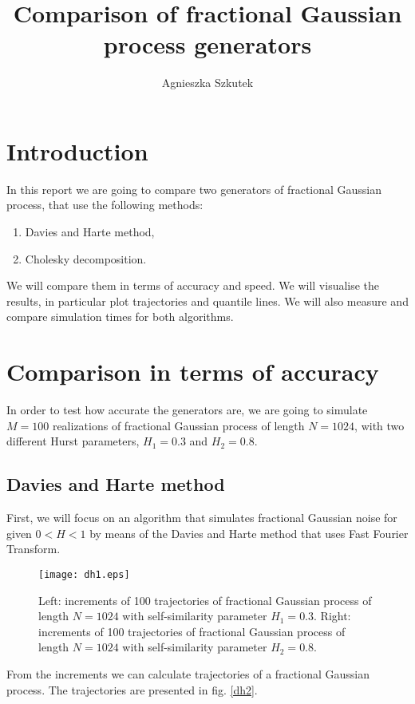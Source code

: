 \documentclass[12pt,titlepage]{article}
\title{Comparison of fractional Gaussian process generators}
\author{Agnieszka Szkutek}
\date{
  \parbox{\linewidth}
  {\centering%
  June 2017
  \endgraf\bigskip\endgraf\bigskip
  \endgraf\bigskip\endgraf\bigskip
  \endgraf\bigskip\endgraf\bigskip
  \endgraf\bigskip\endgraf\bigskip
  \endgraf\bigskip\endgraf\bigskip
  \endgraf\bigskip\endgraf\bigskip
  \endgraf\bigskip\endgraf\bigskip
  \endgraf\bigskip\endgraf\bigskip
  \endgraf\bigskip\endgraf\bigskip
  \endgraf\bigskip\endgraf\bigskip
  Wroclaw University of Science and Technology
  }}
\begin{document}
\maketitle

\section{Introduction}

In this report we are going to compare two generators of fractional Gaussian process, that use the following methods:
\begin{enumerate}
  \item Davies and Harte method,
  \item Cholesky decomposition.
\end{enumerate}

We will compare them in terms of accuracy and speed. We will visualise the results, in particular plot trajectories and quantile lines. We will also measure and compare simulation times for both algorithms.



\section{Comparison in terms of accuracy}
In order to test how accurate the generators are, we are going to simulate $M=100$ realizations of fractional Gaussian process of length $N=1024$, with two different Hurst parameters, $H_1=0.3$ and $H_2 = 0.8$.

\subsection{Davies and Harte method}
First, we will focus on an algorithm that simulates fractional Gaussian noise for given $0< H <1$ by means of the Davies and Harte method that uses Fast Fourier Transform. 


\begin{figure}[H]
  \centering
    \texttt{[image: dh1.eps]}
  \caption{\footnotesize 
  Left: increments of 100 trajectories of fractional Gaussian process of length $N=1024$ with self-similarity parameter $H_1=0.3$.
  Right: increments of 100 trajectories of fractional Gaussian process of length $N=1024$ with self-similarity parameter $H_2=0.8$.
  }
\end{figure}

From the increments we can calculate trajectories of a fractional Gaussian process. The trajectories are presented in fig. \ref{dh2}.
\end{document}

